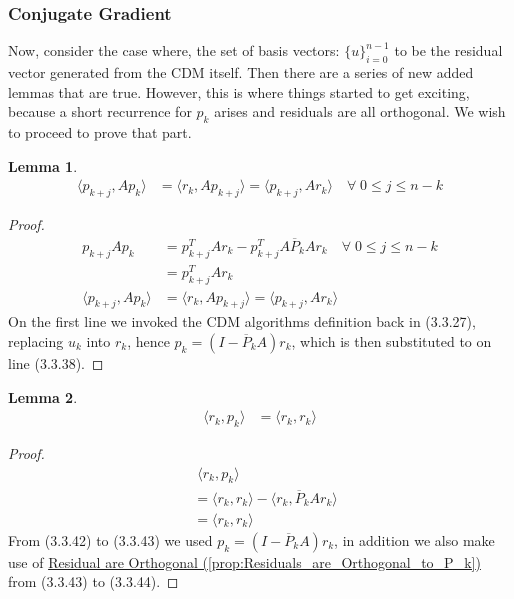 \documentclass[]{article}
\theoremstyle{definition}
\newtheorem{lemma}{Lemma}[subsection]    %
\begin{document}
        \subsubsection{Conjugate Gradient}
            Now, consider the case where, the set of basis vectors: $\{u\}_{i = 0}^{n - 1}$ to be the residual vector generated from the CDM itself. Then there are a series of new added lemmas that are true. However, this is where things started to get exciting, because a short recurrence for $p_k$ arises and residuals are all orthogonal. We wish to proceed to prove that part. 
            \begin{lemma}\label{lemma:CG_Lemma_1}
                \begin{align}
                    \langle p_{k + j}, Ap_k\rangle
                    &=\langle r_k, Ap_{k + j}\rangle
                    = \langle p_{k + j}, Ar_k\rangle \quad \forall\; 0 \le j \le n - k
                \end{align}
            \end{lemma}
            \begin{proof}
                \begin{align}
                    p_{k + j} Ap_k &= p_{k + j}^TAr_k - p_{k + j}^TA\overline{P}_{k}Ar_k \quad 
                    \forall\; 0 \le j \le n - k
                    \\
                    &= p_{k + j}^TAr_k
                    \\
                    \langle p_{k + j}, Ap_k\rangle
                    &= \langle r_k, Ap_{k + j}\rangle
                    = \langle p_{k + j}, Ar_k\rangle
                \end{align}
                On the first line we invoked the CDM algorithms definition back in (3.3.27), replacing $u_k$ into $r_k$, hence $p_k = (I - \overline{P}_kA)r_k$, which is then substituted to on line (3.3.38). 
            \end{proof}
            \begin{lemma}\label{lemma:CG_Lemma_2}
                \begin{align}
                    \langle r_k, p_k\rangle &= \langle r_k, r_k\rangle
                \end{align}
            \end{lemma}
            \begin{proof}
                \begin{align}
                    &\; 
                    \langle r_k, p_k\rangle
                    \\
                    &= \langle r_k, r_k\rangle - \langle r_k, \overline{P}_kAr_k\rangle
                    \\
                    &= \langle r_k, r_k\rangle
                \end{align}
                From (3.3.42) to (3.3.43) we used $p_k = (I - \overline{P}_kA)r_k$, in addition we also make use of \hyperref[prop:Residuals_are_Orthogonal_to_P_k]{Residual are Orthogonal (\ref*{prop:Residuals_are_Orthogonal_to_P_k})} from (3.3.43) to (3.3.44). 
            \end{proof}
\end{document}
